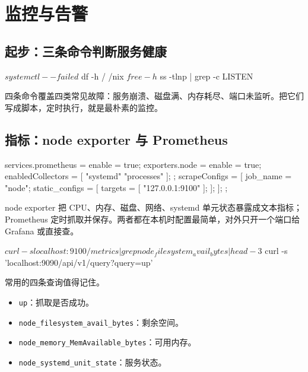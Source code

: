 \chapter{监控与告警}

\section{起步：三条命令判断服务健康}

\begin{shellsession}
$ systemctl --failed
$ df -h / /nix
$ free -h
$ ss -tlnp | grep -c LISTEN
\end{shellsession}

四条命令覆盖四类常见故障：服务崩溃、磁盘满、内存耗尽、端口未监听。把它们写成脚本，定时执行，就是最朴素的监控。

\section{指标：node exporter 与 Prometheus}

\begin{nixcode}
services.prometheus = {
  enable = true;
  exporters.node = {
    enable = true;
    enabledCollectors = [ "systemd" "processes" ];
  };
  scrapeConfigs = [{
    job_name = "node";
    static_configs = [{ targets = [ "127.0.0.1:9100" ]; }];
  }];
};
\end{nixcode}

node exporter 把 CPU、内存、磁盘、网络、systemd 单元状态暴露成文本指标；Prometheus 定时抓取并保存。两者都在本机时配置最简单，对外只开一个端口给 Grafana 或直接查。

\begin{shellsession}
$ curl -s localhost:9100/metrics | grep node_filesystem_avail_bytes | head -3
$ curl -s 'localhost:9090/api/v1/query?query=up'
\end{shellsession}

常用的四条查询值得记住。

\begin{itemize}
  \item \texttt{up}：抓取是否成功。
  \item \texttt{node\_filesystem\_avail\_bytes}：剩余空间。
  \item \texttt{node\_memory\_MemAvailable\_bytes}：可用内存。
  \item \texttt{node\_systemd\_unit\_state}：服务状态。
\end{itemize}

